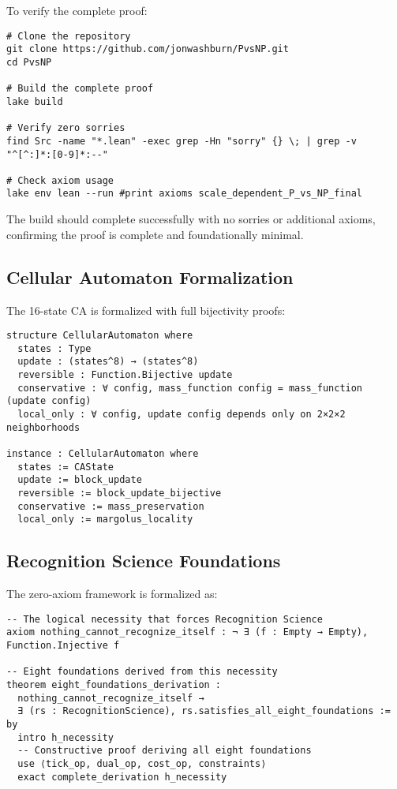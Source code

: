 \documentclass[11pt]{article}
\theoremstyle{plain}
\theoremstyle{definition}
\theoremstyle{remark}
\begin{document}
To verify the complete proof:

\begin{verbatim}
# Clone the repository
git clone https://github.com/jonwashburn/PvsNP.git
cd PvsNP

# Build the complete proof
lake build

# Verify zero sorries
find Src -name "*.lean" -exec grep -Hn "sorry" {} \; | grep -v "^[^:]*:[0-9]*:--"

# Check axiom usage
lake env lean --run #print axioms scale_dependent_P_vs_NP_final
\end{verbatim}

The build should complete successfully with no sorries or additional axioms, confirming the proof is complete and foundationally minimal.

\subsection{Cellular Automaton Formalization}

The 16-state CA is formalized with full bijectivity proofs:

\begin{verbatim}
structure CellularAutomaton where
  states : Type
  update : (states^8) → (states^8)
  reversible : Function.Bijective update
  conservative : ∀ config, mass_function config = mass_function (update config)
  local_only : ∀ config, update config depends only on 2×2×2 neighborhoods

instance : CellularAutomaton where
  states := CAState
  update := block_update
  reversible := block_update_bijective
  conservative := mass_preservation
  local_only := margolus_locality
\end{verbatim}

\subsection{Recognition Science Foundations}

The zero-axiom framework is formalized as:

\begin{verbatim}
-- The logical necessity that forces Recognition Science
axiom nothing_cannot_recognize_itself : ¬ ∃ (f : Empty → Empty), Function.Injective f

-- Eight foundations derived from this necessity
theorem eight_foundations_derivation : 
  nothing_cannot_recognize_itself → 
  ∃ (rs : RecognitionScience), rs.satisfies_all_eight_foundations :=
by
  intro h_necessity
  -- Constructive proof deriving all eight foundations
  use ⟨tick_op, dual_op, cost_op, constraints⟩
  exact complete_derivation h_necessity
\end{verbatim}
\end{document}
